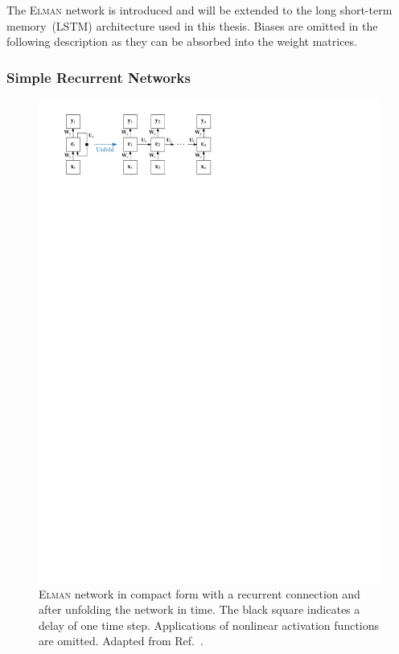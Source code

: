The \textsc{Elman} network is introduced and will be extended to the long
short-term memory~(LSTM) architecture used in this thesis. Biases are omitted in
the following description as they can be absorbed into the weight matrices.

\subsubsection{Simple Recurrent Networks}
\label{sec:simple_recurrent_networks}
\begin{figure}[htb]
  \centering
  \includegraphics{./figures/theory/elman_rnn.pdf}
  \caption{\textsc{Elman} network in compact form with a recurrent connection
    and after unfolding the network in time. The black square indicates a delay
    of one time step. Applications of nonlinear activation functions are
    omitted. Adapted from Ref.~\cite{lecun_bengio_hinton_DL}.}
  \label{fig:schematic_elman_rnn}
\end{figure}

